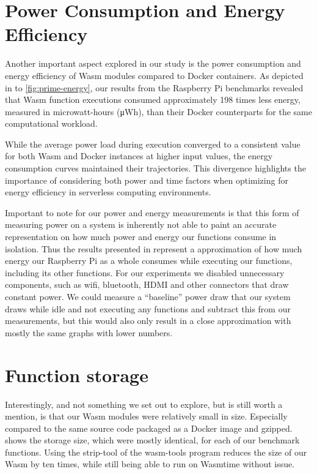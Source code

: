 \documentclass[
  table]{report}
\begin{document}
\section{Power Consumption and Energy Efficiency}

Another important aspect explored in our study is the power consumption
and energy efficiency of \ac{Wasm} modules compared to Docker
containers. As depicted in  to
\cref{fig:prime-energy}, our results from the Raspberry Pi benchmarks
revealed that \ac{Wasm} function executions consumed approximately 198
times less energy, measured in microwatt-hours (μWh), than their Docker
counterparts for the same computational workload.

While the average power load during execution converged to a consistent
value for both \ac{Wasm} and Docker instances at higher input values,
the energy consumption curves maintained their trajectories. This
divergence highlights the importance of considering both power and time
factors when optimizing for energy efficiency in serverless computing
environments.

Important to note for our power and energy measurements is that this
form of measuring power on a system is inherently not able to paint an
accurate representation on how much power and energy our functions
consume in isolation. Thus the results presented in 
represent a approximation of how much energy our Raspberry Pi as a whole
consumes while executing our functions, including its other functions.
For our experiments we disabled unnecessary components, such as wifi,
bluetooth, HDMI and other connectors that draw constant power. We could
measure a ``baseline'' power draw that our system draws while idle and
not executing any functions and subtract this from our measurements, but
this would also only result in a close approximation with mostly the
same graphs with lower numbers.

\section{Function storage}
\label{sect:func_storage}

Interestingly, and not something we set out to explore, but is still
worth a mention, is that our \ac{Wasm} modules were relatively small in
size. Especially compared to the same source code packaged as a Docker
image and gzipped.  shows the storage size,
which were mostly identical, for each of our benchmark functions. Using
the strip-tool of the wasm-tools program reduces the size of our
\ac{Wasm} by ten times, while still being able to run on Wasmtime
without issue.
\end{document}
